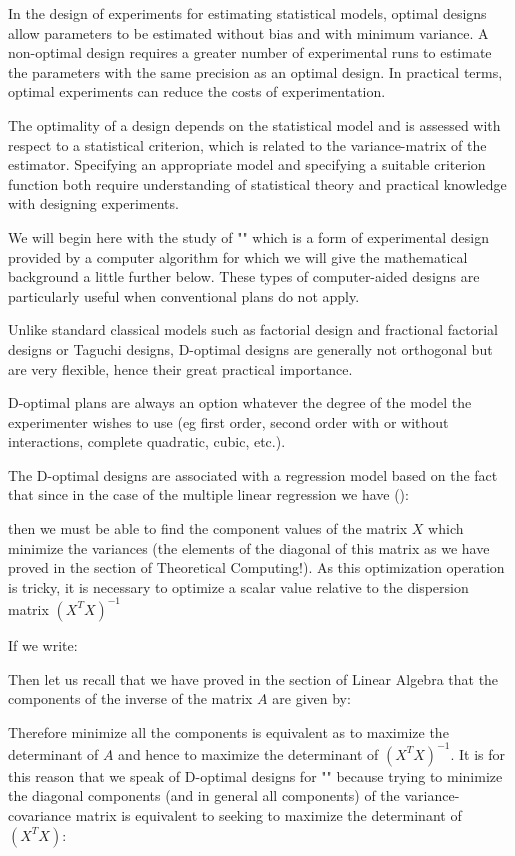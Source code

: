 	In the design of experiments for estimating statistical models, optimal designs allow parameters to be estimated without bias and with minimum variance. A non-optimal design requires a greater number of experimental runs to estimate the parameters with the same precision as an optimal design. In practical terms, optimal experiments can reduce the costs of experimentation.
	
	The optimality of a design depends on the statistical model and is assessed with respect to a statistical criterion, which is related to the variance-matrix of the estimator. Specifying an appropriate model and specifying a suitable criterion function both require understanding of statistical theory and practical knowledge with designing experiments.

	We will begin here with the study of "" which is a form of experimental design provided by a computer algorithm for which we will give the mathematical background a little further below. These types of computer-aided designs are particularly useful when conventional plans do not apply.

	Unlike standard classical models such as factorial design and fractional factorial designs or Taguchi designs, D-optimal designs are generally not orthogonal but are very flexible, hence their great practical importance.

	D-optimal plans are always an option whatever the degree of the model the experimenter wishes to use (eg first order, second order with or without interactions, complete quadratic, cubic, etc.).

	The D-optimal designs are associated with a regression model based on the fact that since in the case of the multiple linear regression we have ():
	
 	then we must be able to find the component values of the matrix $X$ which minimize the variances (the elements of the diagonal of this matrix as we have proved in the section of Theoretical Computing!). As this optimization operation is tricky, it is necessary to optimize a scalar value relative to the dispersion matrix $(X^TX)^{-1}$

	If we write:
	
	Then let us recall that we have proved in the section of Linear Algebra that the components of the inverse of the matrix $A$ are given by:
	
	Therefore minimize all the components is equivalent as to maximize the determinant of $A$ and hence to maximize the determinant of $(X^TX)^{-1}$. It is for this reason that we speak of D-optimal designs for "" because trying to minimize the diagonal components (and in general all components) of the variance-covariance matrix is equivalent to seeking to maximize the determinant of $(X^TX)$:
	
